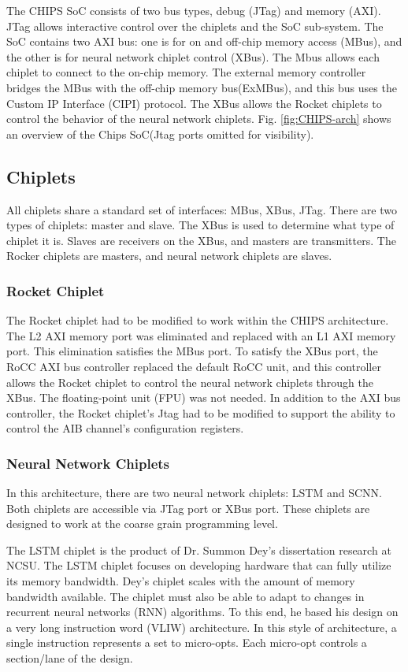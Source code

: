 \documentclass[../main.tex]{subfiles}
\begin{document}
The CHIPS SoC consists of two bus types, debug (JTag) and memory (AXI). JTag allows interactive control over the chiplets and the SoC sub-system. The SoC contains two AXI bus: one is for on and off-chip memory access (MBus), and the other is for neural network chiplet control (XBus).  The Mbus allows each chiplet to connect to the on-chip memory. The external memory controller bridges the MBus with the off-chip memory bus(ExMBus), and this bus uses the Custom IP Interface (CIPI) protocol. The XBus allows the Rocket chiplets to control the behavior of the neural network chiplets. Fig. \ref{fig:CHIPS-arch} shows an overview of the Chips SoC(Jtag ports omitted for visibility).


\subsection{Chiplets}
All chiplets share a standard set of interfaces: MBus, XBus, JTag. There are two types of chiplets: master and slave. The XBus is used to determine what type of chiplet it is. Slaves are receivers on the XBus, and masters are transmitters. The Rocker chiplets are masters, and neural network chiplets are slaves.

\subsubsection{Rocket Chiplet}
The Rocket chiplet had to be modified to work within the CHIPS architecture. The L2 AXI memory port was eliminated and replaced with an L1 AXI memory port. This elimination satisfies the MBus port. To satisfy the XBus port, the RoCC AXI bus controller replaced the default RoCC unit, and this controller allows the Rocket chiplet to control the neural network chiplets through the XBus. The floating-point unit (FPU) was not needed. In addition to the AXI bus controller, the Rocket chiplet's Jtag had to be modified to support the ability to control the AIB channel's configuration registers.

\subsubsection{Neural Network Chiplets}
In this architecture, there are two neural network chiplets: LSTM and SCNN. Both chiplets are accessible via JTag port or XBus port. These chiplets are designed to work at the coarse grain programming level. 

The LSTM chiplet is the product of Dr. Summon Dey's dissertation research at NCSU\cite{Summon-Dey-LSTM}. The LSTM chiplet focuses on developing hardware that can fully utilize its memory bandwidth. Dey's chiplet scales with the amount of memory bandwidth available. The chiplet must also be able to adapt to changes in recurrent neural networks (RNN) algorithms. To this end, he based his design on a very long instruction word (VLIW) architecture. In this style of architecture, a single instruction represents a set to micro-opts. Each micro-opt controls a section/lane of the design.
\end{document}
